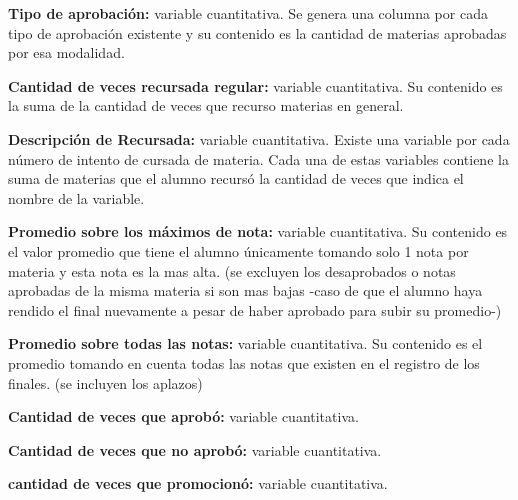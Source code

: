 \vspace{3mm}

\textbf{Tipo de aprobación:} variable cuantitativa. Se genera una columna por cada tipo de aprobación existente y su contenido es la cantidad de materias aprobadas por esa modalidad.

\vspace{3mm}

\textbf{Cantidad de veces recursada regular:} variable cuantitativa. Su contenido es la suma de la cantidad de veces que recurso materias en general.

\vspace{3mm}

\textbf{Descripción de Recursada:} variable cuantitativa. Existe una variable por cada número de intento de cursada de materia. Cada una de estas variables contiene la suma de materias que el alumno recursó la cantidad de veces que indica el nombre de la variable.

\vspace{3mm}

\textbf{Promedio sobre los máximos de nota:} variable cuantitativa. Su contenido es el valor promedio que tiene el alumno únicamente tomando solo 1 nota por materia y esta nota es la mas alta. (se excluyen los desaprobados o notas aprobadas de la misma materia si son mas bajas -caso de que el alumno haya rendido el final nuevamente a pesar de haber aprobado para subir su promedio-)

\vspace{3mm}

\textbf{Promedio sobre todas las notas:} variable cuantitativa. Su contenido es el promedio tomando en cuenta todas las notas que existen en el registro de los finales. (se incluyen los aplazos)

\vspace{3mm}

\textbf{Cantidad de veces que aprobó:} variable cuantitativa.

\vspace{3mm}

\textbf{Cantidad de veces que no aprobó:} variable cuantitativa.

\vspace{3mm}

\textbf{cantidad de veces que promocionó:} variable cuantitativa.

\vspace{3mm}






